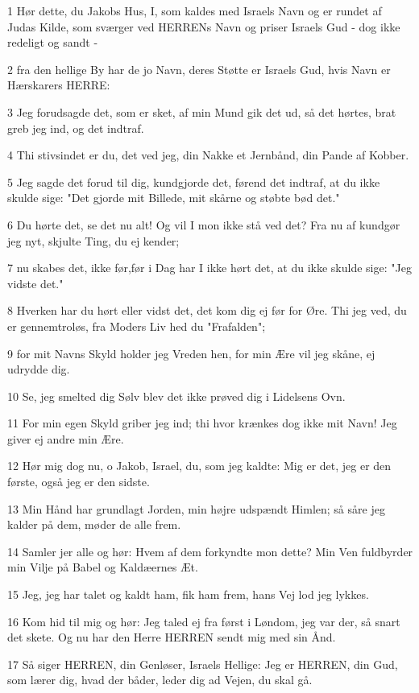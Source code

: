\par 1 Hør dette, du Jakobs Hus, I, som kaldes med Israels Navn og er rundet af Judas Kilde, som sværger ved HERRENs Navn og priser Israels Gud - dog ikke redeligt og sandt -
\par 2 fra den hellige By har de jo Navn, deres Støtte er Israels Gud, hvis Navn er Hærskarers HERRE:
\par 3 Jeg forudsagde det, som er sket, af min Mund gik det ud, så det hørtes, brat greb jeg ind, og det indtraf.
\par 4 Thi stivsindet er du, det ved jeg, din Nakke et Jernbånd, din Pande af Kobber.
\par 5 Jeg sagde det forud til dig, kundgjorde det, førend det indtraf, at du ikke skulde sige: "Det gjorde mit Billede, mit skårne og støbte bød det."
\par 6 Du hørte det, se det nu alt! Og vil I mon ikke stå ved det? Fra nu af kundgør jeg nyt, skjulte Ting, du ej kender;
\par 7 nu skabes det, ikke før,før i Dag har I ikke hørt det, at du ikke skulde sige: "Jeg vidste det."
\par 8 Hverken har du hørt eller vidst det, det kom dig ej før for Øre. Thi jeg ved, du er gennemtroløs, fra Moders Liv hed du "Frafalden";
\par 9 for mit Navns Skyld holder jeg Vreden hen, for min Ære vil jeg skåne, ej udrydde dig.
\par 10 Se, jeg smelted dig Sølv blev det ikke prøved dig i Lidelsens Ovn.
\par 11 For min egen Skyld griber jeg ind; thi hvor krænkes dog ikke mit Navn! Jeg giver ej andre min Ære.
\par 12 Hør mig dog nu, o Jakob, Israel, du, som jeg kaldte: Mig er det, jeg er den første, også jeg er den sidste.
\par 13 Min Hånd har grundlagt Jorden, min højre udspændt Himlen; så såre jeg kalder på dem, møder de alle frem.
\par 14 Samler jer alle og hør: Hvem af dem forkyndte mon dette? Min Ven fuldbyrder min Vilje på Babel og Kaldæernes Æt.
\par 15 Jeg, jeg har talet og kaldt ham, fik ham frem, hans Vej lod jeg lykkes.
\par 16 Kom hid til mig og hør: Jeg taled ej fra først i Løndom, jeg var der, så snart det skete. Og nu har den Herre HERREN sendt mig med sin Ånd.
\par 17 Så siger HERREN, din Genløser, Israels Hellige: Jeg er HERREN, din Gud, som lærer dig, hvad der båder, leder dig ad Vejen, du skal gå.
